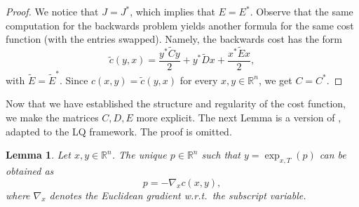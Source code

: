 \documentclass[reqno]{amsart}
\theoremstyle{plain}
\newtheorem{lem}[thm]{Lemma}
\theoremstyle{definition}
\theoremstyle{remark}
\newcommand{\R}{\mathbb{R}}
\begin{document}
\begin{proof}
		We notice that $J=J^*$, which implies that $E=E^*$. Observe that the same computation for the backwards problem yields another formula for the same cost function (with the entries swapped). Namely, the backwards cost has the form
		\begin{equation}
			\tilde{c}(y,x)=\frac{y^*\tilde{C}y}{2}+y^*\tilde{D}x+\frac{x^*\tilde{E}x}{2},
		\end{equation}
		with $\tilde{E}=\tilde{E}^*$. Since $c(x,y)=\tilde{c}(y,x)$ for every $x,y\in\mathbb{R}^{n}$, we get $C=C^*$.
	\end{proof}
	Now that we have established the structure and regularity of the cost function, we make the matrices $C,D,E$ more explicit. The next Lemma is a version of \cite[Proposition 4.3]{Agrachev_2018}, adapted to the LQ framework. The proof is omitted.
	\begin{lem}\label{lem2}
Let $x,y\in\R^n$. The unique $p\in \R^n$ such that $y=\exp_{x,T}(p)$ can be obtained as
        \begin{equation}
            p=-\nabla_x c(x,y),
        \end{equation}
        where $\nabla_x$ denotes the Euclidean gradient w.r.t.\ the subscript variable.
 	\end{lem}
        
\end{document}
